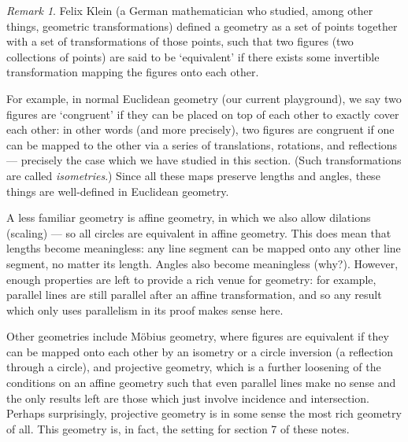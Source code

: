 \documentclass[a4paper,leqno,10pt]{article}
\theoremstyle{exercise}
\theoremstyle{plain}
\theoremstyle{definition}
\theoremstyle{remark}
\newtheorem*{rem}{Remark}
\begin{document}
\begin{rem}
  Felix Klein (a German mathematician who studied, among other things, geometric transformations) defined a geometry
  as a set of points together with a set of transformations of those points, such that two figures (two collections
  of points) are said to be `equivalent' if there exists some invertible transformation mapping the figures onto each other.

  For example, in normal Euclidean geometry (our current playground), we say two figures are `congruent' if they
  can be placed on top of each other to exactly cover each other: in other words (and more precisely), two figures
  are congruent if one can be mapped to the other via a series of translations, rotations, and reflections --- precisely the case
  which we have studied in this section. (Such transformations are called \emph{isometries}.) Since all these maps
  preserve lengths and angles, these things are well-defined in Euclidean geometry.

  A less familiar geometry is affine geometry, in which we also allow dilations (scaling) --- so all circles
  are equivalent in affine geometry. This does mean that lengths become meaningless: any line segment can be
  mapped onto any other line segment, no matter its length. Angles also become meaningless (why?). However, enough
  properties are left to provide a rich venue for geometry: for example, parallel lines are still parallel after an
  affine transformation, and so any result which only uses parallelism in its proof makes sense here.

  Other geometries include M\"obius geometry, where figures are equivalent if they can be mapped onto each other
  by an isometry or a circle inversion (a reflection through a circle), and projective geometry, which is a further
  loosening of the conditions on an affine geometry  such that even parallel lines make no sense and the only results
  left are those which just involve incidence and intersection. Perhaps surprisingly, projective geometry is in
  some sense the most rich geometry of all. This geometry is, in fact, the setting for section 7 of these notes.
\end{rem}
\end{document}
